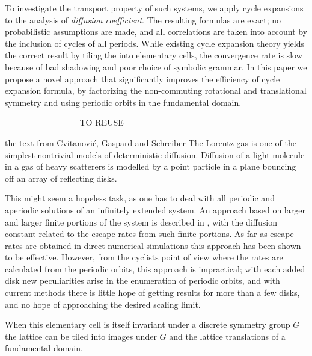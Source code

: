To investigate the transport property of such systems, we apply cycle
expansions to the analysis of {\em diffusion coefficient}.
The resulting formulas are exact; no probabilistic assumptions are made,
and all correlations are taken into account by the  inclusion of cycles
of all periods. While existing cycle expansion theory yields the correct
result by tiling the {\statesp} into elementary cells, the convergence
rate is slow because of bad shadowing and poor choice of symbolic
grammar. In this paper we propose a novel approach that
significantly improves the efficiency of cycle expansion formula, by
factorizing the non-commuting rotational and translational symmetry and
using periodic orbits in the fundamental domain.



\bigskip
=========== TO REUSE ========


\bigskip

    {the text from Cvitanovi\'c, Gaspard and Schreiber}
The Lorentz gas is one of the simplest nontrivial models
of deterministic diffusion.
Diffusion of a light molecule in a gas of heavy scatterers
is modelled
by a point particle in a plane bouncing off an array of reflecting disks.

This might seem a hopeless task, as one
has to deal with all periodic and aperiodic
solutions of an infinitely extended system. An
approach based on larger and larger finite portions of the system is described
in , with the diffusion constant related to
the escape rates from such finite portions.
As far as escape rates are obtained in direct numerical simulations
this approach has been shown to be effective.
However, from the cyclists point of view
where the rates are calculated from the periodic orbits,
this approach is impractical; with each added disk new peculiarities arise
in the enumeration of periodic orbits, and with current
methods there is little hope of getting results for more than a few disks,
and no hope of approaching the desired scaling limit.

When this elementary cell is itself invariant under a discrete symmetry
group $G$ the lattice can be tiled into images under $G$ and the lattice
translations of a fundamental domain.

